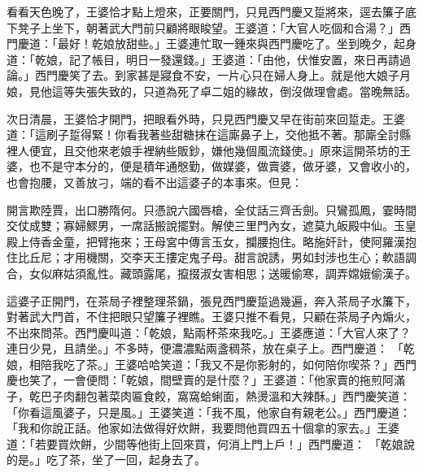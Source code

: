 \begin{showcontents}{}
看看天色晚了，王婆恰才點上燈來，正要關門，只見西門慶又踅將來，逕去簾子底下凳子上坐下，朝著武大門前只顧將眼睃望。王婆道：「大官人吃個和合湯？」西門慶道：「最好！乾娘放甜些。」王婆連忙取一鍾來與西門慶吃了。坐到晚夕，起身道：「乾娘，記了帳目，明日一發還錢。」王婆道：「由他，伏惟安置，來日再請過論。」西門慶笑了去。到家甚是寢食不安，一片心只在婦人身上。就是他大娘子月娘，見他這等失張失致的，只道為死了卓二姐的緣故，倒沒做理會處。當晚無話。

次日清晨，王婆恰才開門，把眼看外時，只見西門慶又早在街前來回踅走。王婆道：「這刷子踅得緊！你看我著些甜糖抹在這廝鼻子上，交他抵不著。那廝全討縣裡人便宜，且交他來老娘手裡納些販鈔，嫌他幾個風流錢使。」原來這開茶坊的王婆，也不是守本分的，便是積年通慇勤，做媒婆，做賣婆，做牙婆，又會收小的，也會抱腰，又善放刁，端的看不出這婆子的本事來。但見：

開言欺陸賈，出口勝隋何。只憑說六國唇槍，全仗話三齊舌劍。只鸞孤鳳，霎時間交仗成雙；寡婦鰥男，一席話搬說擺對。解使三里門內女，遮莫九皈殿中仙。玉皇殿上侍香金童，把臂拖來；王母宮中傳言玉女，攔腰抱住。略施奸計，使阿羅漢抱住比丘尼；才用機關，交李天王摟定鬼子母。甜言說誘，男如封涉也生心；軟語調合，女似麻姑須亂性。藏頭露尾，攛掇淑女害相思；送暖偷寒，調弄嫦娥偷漢子。

這婆子正開門，在茶局子裡整理茶鍋，張見西門慶踅過幾遍，奔入茶局子水簾下，對著武大門首，不住把眼只望簾子裡瞧。王婆只推不看見，只顧在茶局子內煽火，不出來問茶。西門慶叫道：「乾娘，點兩杯茶來我吃。」王婆應道：「大官人來了？連日少見，且請坐。」不多時，便濃濃點兩盞稠茶，放在桌子上。西門慶道： 「乾娘，相陪我吃了茶。」王婆哈哈笑道：「我又不是你影射的，如何陪你喫茶？」西門慶也笑了，一會便問：「乾娘，間壁賣的是什麼？」王婆道：「他家賣的拖煎阿滿子，乾巴子肉翻包著菜肉匾食餃，窩窩蛤蜊面，熱燙溫和大辣酥。」西門慶笑道：「你看這風婆子，只是風。」王婆笑道：「我不風，他家自有親老公。」西門慶道：「我和你說正話。他家如法做得好炊餅，我要問他買四五十個拿的家去。」王婆道：「若要買炊餅，少間等他街上回來買，何消上門上戶！」西門慶道： 「乾娘說的是。」吃了茶，坐了一回，起身去了。


\end{showcontents}
